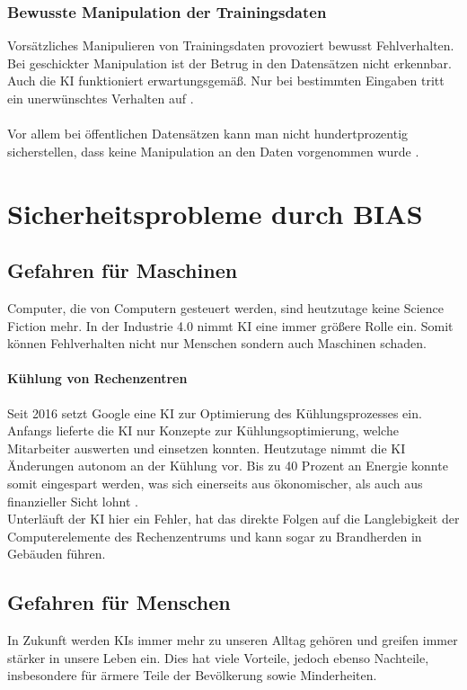 \documentclass[12pt,oneside,a4paper,parskip]{scrbook}
\begin{document}
\subsection{Bewusste Manipulation der Trainingsdaten}
\label{section:manipulationInData}
Vorsätzliches Manipulieren von Trainingsdaten provoziert bewusst Fehlverhalten. Bei geschickter Manipulation ist der Betrug in den Datensätzen nicht erkennbar. Auch die KI funktioniert erwartungsgemäß. Nur bei bestimmten Eingaben tritt ein unerwünschtes Verhalten auf \cite{KIPediaBias}. \\\\
Vor allem bei öffentlichen Datensätzen kann man nicht hundertprozentig sicherstellen, dass keine Manipulation an den Daten vorgenommen wurde .
\chapter{Sicherheitsprobleme durch BIAS}
\section{Gefahren für Maschinen}
Computer, die von Computern gesteuert werden, sind heutzutage keine Science Fiction mehr. In der Industrie 4.0 nimmt KI eine immer größere Rolle ein. Somit können Fehlverhalten nicht nur Menschen sondern auch Maschinen schaden.
\subsubsection{Kühlung von Rechenzentren}
Seit 2016 setzt Google eine KI zur Optimierung des Kühlungsprozesses ein. Anfangs lieferte die KI nur Konzepte zur Kühlungsoptimierung, welche Mitarbeiter auswerten und einsetzen konnten. Heutzutage nimmt die KI Änderungen autonom an der Kühlung vor. Bis zu 40 Prozent an Energie konnte somit eingespart werden, was sich einerseits aus ökonomischer, als auch aus finanzieller Sicht lohnt \cite{GoogleKI}.\\
Unterläuft der KI hier ein Fehler, hat das direkte Folgen auf die Langlebigkeit der Computerelemente des Rechenzentrums und kann sogar zu Brandherden in Gebäuden führen.
\section{Gefahren für Menschen}
In Zukunft werden KIs immer mehr zu unseren Alltag gehören und greifen immer stärker in unsere Leben ein. Dies hat viele Vorteile, jedoch ebenso Nachteile, insbesondere für ärmere Teile der Bevölkerung sowie Minderheiten.
\end{document}

